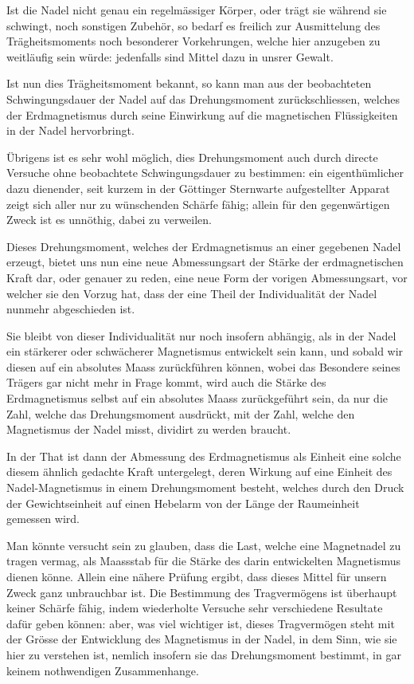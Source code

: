 \documentclass[12pt,a4paper]{article}
\begin{document}
Ist die Nadel nicht genau ein regelmässiger Körper, oder trägt sie während sie schwingt, noch sonstigen Zubehör, so bedarf es freilich zur Ausmittelung des Trägheitsmoments noch besonderer Vorkehrungen, welche hier anzugeben zu weitläufig sein würde: jedenfalls sind Mittel dazu in unsrer Gewalt.

Ist nun dies Trägheitsmoment bekannt, so kann man aus der beobachteten Schwingungsdauer der Nadel auf das Drehungsmoment zurückschliessen, welches der Erdmagnetismus durch seine Einwirkung auf die magnetischen Flüssigkeiten in der Nadel hervorbringt.

Übrigens ist es sehr wohl möglich, dies Drehungsmoment auch durch directe Versuche ohne beobachtete Schwingungsdauer zu bestimmen: ein eigenthümlicher dazu dienender, seit kurzem in der Göttinger Sternwarte aufgestellter Apparat zeigt sich aller nur zu wünschenden Schärfe fähig; allein für den gegenwärtigen Zweck ist es unnöthig, dabei zu verweilen.

\bigskip

Dieses Drehungsmoment, welches der Erdmagnetismus an einer gegebenen Nadel erzeugt, bietet uns nun eine neue Abmessungsart der Stärke der erdmagnetischen Kraft dar, oder genauer zu reden, eine neue Form der vorigen Abmessungsart, vor welcher sie den Vorzug hat, dass der eine Theil der Individualität der Nadel nunmehr abgeschieden ist.

Sie bleibt von dieser Individualität nur noch insofern abhängig, als in der Nadel ein stärkerer oder schwächerer Magnetismus entwickelt sein kann, und sobald wir diesen auf ein absolutes Maass zurückführen können, wobei das Besondere seines Trägers gar nicht mehr in Frage kommt, wird auch die Stärke des Erdmagnetismus selbst auf ein absolutes Maass zurückgeführt sein, da nur die Zahl, welche das Drehungsmoment ausdrückt, mit der Zahl, welche den Magnetismus der Nadel misst, dividirt zu werden braucht.

In der That ist dann der Abmessung des Erdmagnetismus als Einheit eine solche diesem ähnlich gedachte Kraft untergelegt, deren Wirkung auf eine Einheit des Nadel-Magnetismus in einem Drehungsmoment besteht, welches durch den Druck der Gewichtseinheit auf einen Hebelarm von der Länge der Raumeinheit gemessen wird.

Man könnte versucht sein zu glauben, dass die Last, welche eine Magnetnadel zu tragen vermag, als Maassstab für die Stärke des darin entwickelten Magnetismus dienen könne. Allein eine nähere Prüfung ergibt, dass dieses Mittel für unsern Zweck ganz unbrauchbar ist. Die Bestimmung des Tragvermögens ist überhaupt keiner Schärfe fähig, indem wiederholte Versuche sehr verschiedene Resultate dafür geben können: aber, was viel wichtiger ist, dieses Tragvermögen steht mit der Grösse der Entwicklung des Magnetismus in der Nadel, in dem Sinn, wie sie hier zu verstehen ist, nemlich insofern sie das Drehungsmoment bestimmt, in gar keinem nothwendigen Zusammenhange.
\end{document}
